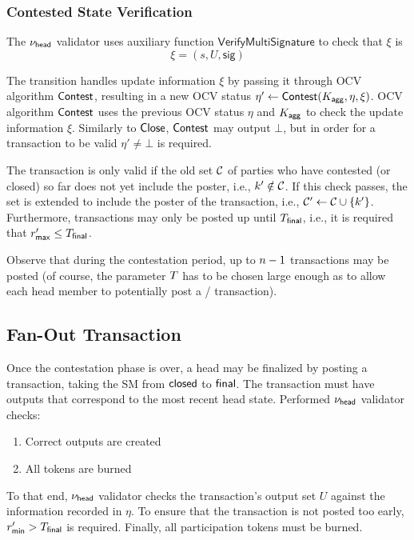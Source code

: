 \subsubsection{Contested State Verification}

The $\nu_\mathsf{head}$ validator uses auxiliary function $\mathsf{VerifyMultiSignature}$ to check that $\xi$ is 
$$
\xi = (s,U, \mathsf{sig})
$$

The transition handles update
information $\xi$ by passing it through OCV algorithm $\mathsf{Contest}$,
resulting in a new OCV status
$\eta' \gets \mathsf{Contest} (K_{\mathsf{agg}},\eta,\xi)$.  OCV algorithm
$\mathsf{Contest}$ uses the previous OCV status $\eta$ and $K_{\mathsf{agg}}$ to check
the update information $\xi$.  Similarly to $\mathsf{Close}$, $\mathsf{Contest}$
may output $\bot$, but in order for a \mtxContest{} transaction to be
valid $\eta' \neq \bot$ is required.

The \mtxContest{} transaction is only valid if the old set
$\mathcal C$ of parties who have contested (or closed) so far does not yet
include the poster, i.e., $k' \notin \mathcal C$.  If this check
passes, the set is extended to include the poster of the \mtxContest{}
transaction, i.e., $\mathcal C' \gets \mathcal C \cup \{k'\}$.
Furthermore, \mtxContest{} transactions may only be posted up until
$T_{\mathsf{final}}$, i.e., it is required that $r_{\mathsf{max}}' \leq T_{\mathsf{final}}$.

Observe that during the contestation period, up to $n-1$
\mtxContest{} transactions may be posted (of course, the parameter
$T$ has to be chosen large enough as to allow each head member to
potentially post a \mtxClose{}/\mtxContest{} transaction).






\subsection{Fan-Out Transaction}  

Once the contestation phase is over, a head
may be finalized by posting a \mtxFanout{} transaction, taking the SM
from $\mathsf{closed}$ to $\mathsf{final}$.  The \mtxFanout{} transaction must
have outputs that correspond to the most recent head state. 
\newline
\newline 
Performed $\nu_\mathsf{head}$ validator checks:
\begin{enumerate}
  \item Correct outputs are created
  \item All tokens are burned
\end{enumerate}

\noindent To that end, $\nu_\mathsf{head}$ validator checks the transaction's output set $U$
against the information recorded in $\eta$. To ensure that the \mtxFanout{} transaction is not posted too early,
$r_{\mathsf{min}}' > T_{\mathsf{final}}$ is required.  Finally, all participation tokens
must be burned.


